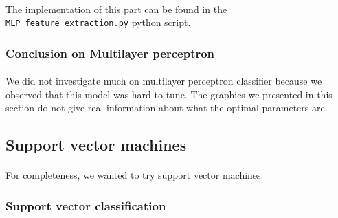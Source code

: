 \documentclass[a4paper, 11pt, oneside]{article}
\begin{document}
\paragraph{}The implementation of this part can be found in the \texttt{MLP\_feature\_extraction.py} python script.

\subsubsection{Conclusion on Multilayer perceptron}

\paragraph{}We did not investigate much on multilayer perceptron classifier because we observed that this model was hard to tune. The graphics we presented in this section do not give real information about what the optimal parameters are.


\subsection{Support vector machines}
\paragraph{}For completeness, we wanted to try support vector machines.

\subsubsection{Support vector classification} \label{subsubsec:svc}
\end{document}
